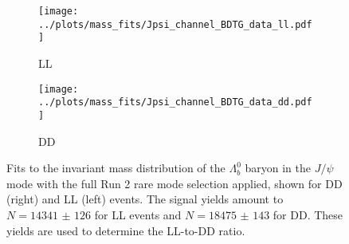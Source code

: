 \begin{figure}
   \centering
    \begin{subfigure}[b]{0.48\textwidth}
        \centering
        \texttt{[image: ../plots/mass\_fits/Jpsi\_channel\_BDTG\_data\_ll.pdf]}
        \caption{LL}
    \end{subfigure}
    \hfill
    \begin{subfigure}[b]{0.48\textwidth}
        \centering
        \texttt{[image: ../plots/mass\_fits/Jpsi\_channel\_BDTG\_data\_dd.pdf]}
        \caption{DD}
    \end{subfigure}
    \caption{Fits to the invariant mass distribution of the $\Lambda_b^0$ baryon in the $J/\psi$ mode with the full Run 2 rare mode selection applied, shown for DD (right) and LL (left) events. The signal yields amount to $N = \num{14341(126)}$ for LL events and $N = \num{18475(143)}$ for DD. These yields are used to determine the LL-to-DD ratio.}
    \label{fig:run2_kinematic_corrections}
\end{figure}